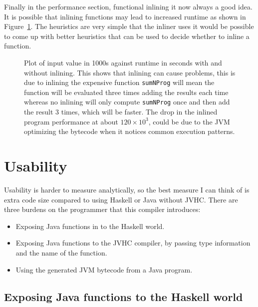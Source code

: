 \documentclass[float=false, crop=false]{standalone}
\newlength\gwidth
\newlength\gheight
\newcommand{\importMGraph}[3]{\setlength{\gwidth}{#2}\setlength{\gheight}{#3}{#1}}
\begin{document}
Finally in the performance section, functional inlining it now always a good idea.
It is possible that inlining functions may lead to increased runtime as shown in 
Figure~\ref{plot:badInline}. The heuristics are very simple
that the inliner uses it would be possible to come up with better heuristics that can be
used to decide whether to inline a function.

\begin{figure}
  \centering
  \importMGraph{plotBadInline}{0.96\textwidth}{0.3\textwidth}
  \caption[Plot of \texttt{badProg} as a function of $n$. Comparing the inlined and non-inlined
  versions of the compiled program]
  {Plot of input value in 1000s against runtime in seconds with and without inlining.
    This shows that inlining can cause problems, this is due to inlining the expensive function
    \texttt{sumNProg} will mean the function will be evaluated three times adding the results each time
    whereas no inlining will only compute \texttt{sumNProg} once and then add the result 3 times, 
    which will be faster. The drop in the inlined program performance at about $120 \times 10^3$, 
    could be due to the JVM optimizing the bytecode when it notices common execution patterns.}
    \label{plot:badInline}
\end{figure}

\section{Usability}

Usability is harder to measure analytically, so the best measure I can think of is extra code size
compared to using Haskell or Java without JVHC.
There are three burdens on the programmer that this compiler introduces:
\begin{itemize}
  \item Exposing Java functions in to the Haskell world.
  \item Exposing Java functions to the JVHC compiler, by passing type information and the name 
    of the function.

  \item Using the generated JVM bytecode from a Java program.
\end{itemize}

\subsection{Exposing Java functions to the Haskell world}
\end{document}
